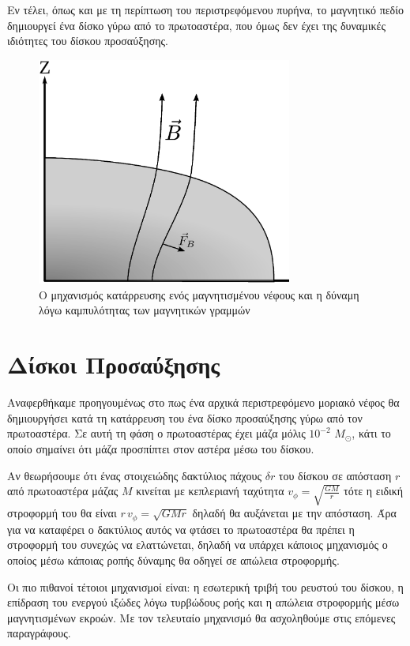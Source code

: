 \documentclass[a4paper,12pt]{memoir}
\newcommand{\sm}{$M_{\odot}$}
\begin{document}
Εν τέλει, όπως και με τη περίπτωση του περιστρεφόμενου πυρήνα, το μαγνητικό πεδίο δημιουργεί ένα δίσκο γύρω από το πρωτοαστέρα, που όμως δεν έχει της δυναμικές ιδιότητες του δίσκου προσαύξησης.


\begin{figure}[h]
	\centering
	\includegraphics[height=7.5cm]{images/magnetic_collapse.ps}
	\caption{Ο μηχανισμός κατάρρευσης ενός μαγνητισμένου νέφους και η δύναμη λόγω καμπυλότητας των μαγνητικών γραμμών}
\end{figure}


\section{Δίσκοι Προσαύξησης}
Αναφερθήκαμε προηγουμένως στο πως ένα αρχικά περιστρεφόμενο μοριακό νέφος θα δημιουργήσει κατά τη κατάρρευση του ένα δίσκο προσαύξησης γύρω από τον πρωτοαστέρα. Σε αυτή τη φάση ο πρωτοαστέρας έχει μάζα μόλις $10^{-2}$ \sm, κάτι το οποίο σημαίνει ότι μάζα προσπίπτει στον αστέρα μέσω του δίσκου.

Αν θεωρήσουμε ότι ένας στοιχειώδης δακτύλιος πάχους $\delta r$ του δίσκου σε απόσταση $r$ από πρωτοαστέρα μάζας $M$ κινείται με κεπλεριανή ταχύτητα $v_{\phi}=\sqrt{\frac{GM}{r}}$ τότε η ειδική στροφορμή του θα είναι $r \, v_{\phi}=\sqrt{GMr}$ δηλαδή θα αυξάνεται με την απόσταση. Άρα για να καταφέρει ο δακτύλιος αυτός να φτάσει το πρωτοαστέρα θα πρέπει η στροφορμή του συνεχώς να ελαττώνεται, δηλαδή να υπάρχει κάποιος μηχανισμός ο οποίος μέσω κάποιας ροπής δύναμης θα οδηγεί σε απώλεια στροφορμής.

Οι πιο πιθανοί τέτοιοι μηχανισμοί είναι: η εσωτερική τριβή του ρευστού του δίσκου, η επίδραση του ενεργού ιξώδες λόγω τυρβώδους ροής και η απώλεια στροφορμής μέσω μαγνητισμένων εκροών.
Με τον τελευταίο μηχανισμό θα ασχοληθούμε στις επόμενες παραγράφους.
\end{document}
